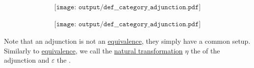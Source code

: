 \begin{definition}
\begin{thmenum}
    \begin{minipage}{0.43\textwidth}
      \begin{equation}\label{eq:def:category_adjunction/d_triangle}
        \begin{aligned}
          \texttt{[image: output/def\_\_category\_adjunction.pdf]}
        \end{aligned}
      \end{equation}
    \end{minipage}
    \hfill
    \begin{minipage}{0.44\textwidth}
      \raggedright
      \begin{equation}\label{eq:def:category_adjunction/c_triangle}
        \begin{aligned}
          \texttt{[image: output/def\_\_category\_adjunction.pdf]}
        \end{aligned}
      \end{equation}
    \end{minipage}
    \smallskip

    Note that an adjunction is not an \hyperref[def:category_equivalence]{equivalence}, they simply have a common setup. Similarly to \hyperref[def:category_equivalence]{equivalence}, we call the \hyperref[def:natural_transformation]{natural transformation} \( \eta \) the  of the adjunction and \( \varepsilon \) the .
  \end{thmenum}
\end{definition}
